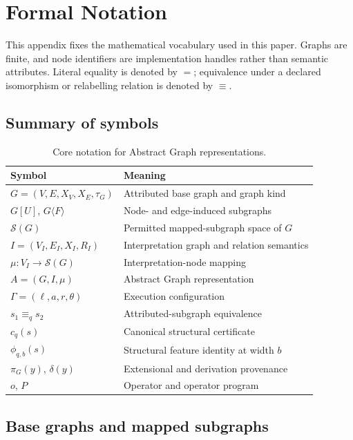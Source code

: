 \section{Formal Notation}
\label{app:formal-notation}

This appendix fixes the mathematical vocabulary used in this paper. Graphs are
finite, and node identifiers are implementation handles rather than semantic
attributes. Literal equality is denoted by \(=\); equivalence under a declared
isomorphism or relabelling relation is denoted by \(\equiv\).

\subsection{Summary of symbols}

\begin{table}[ht]
  \centering
  \caption{Core notation for Abstract Graph representations.}
  \label{tab:formal-notation}
  \begin{tabular}{@{}ll@{}}
    \toprule
    Symbol & Meaning \\
    \midrule
    \(G=(V,E,X_V,X_E,\tau_G)\) & Attributed base graph and graph kind \\
    \(G[U]\), \(G\langle F\rangle\) & Node- and edge-induced subgraphs \\
    \(\mathcal{S}(G)\) & Permitted mapped-subgraph space of \(G\) \\
    \(I=(V_I,E_I,X_I,R_I)\) & Interpretation graph and relation semantics \\
    \(\mu:V_I\to\mathcal{S}(G)\) & Interpretation-node mapping \\
    \(A=(G,I,\mu)\) & Abstract Graph representation \\
    \(\Gamma=(\ell,a,r,\theta)\) & Execution configuration \\
    \(s_1\equiv_q s_2\) & Attributed-subgraph equivalence \\
    \(c_q(s)\) & Canonical structural certificate \\
    \(\phi_{q,b}(s)\) & Structural feature identity at width \(b\) \\
    \(\pi_G(y)\), \(\delta(y)\) & Extensional and derivation provenance \\
    \(o\), \(P\) & Operator and operator program \\
    \bottomrule
  \end{tabular}
\end{table}

\subsection{Base graphs and mapped subgraphs}

